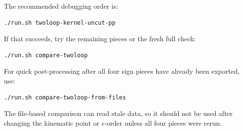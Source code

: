 \documentclass[11pt]{article}
\newcommand{\eps}{\epsilon}
\begin{document}
The recommended debugging order is:
\begin{verbatim}
./run.sh twoloop-kernel-uncut-pp
\end{verbatim}
If that succeeds, try the remaining pieces or the fresh full check:
\begin{verbatim}
./run.sh compare-twoloop
\end{verbatim}
For quick post-processing after all four sign pieces have already been
exported, use:
\begin{verbatim}
./run.sh compare-twoloop-from-files
\end{verbatim}
The file-based comparison can read stale data, so it should not be used after
changing the kinematic point or \(\eps\)-order unless all four pieces were
rerun.
\end{document}
